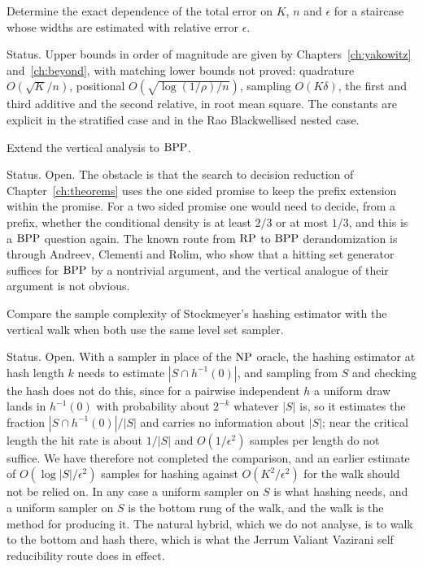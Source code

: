 \begin{problem}
Determine the exact dependence of the total error on $K$, $n$ and $\epsilon$ for a staircase whose widths are estimated with relative error $\epsilon$.
\end{problem}

Status. Upper bounds in order of magnitude are given by Chapters~\ref{ch:yakowitz} and~\ref{ch:beyond}, with matching lower bounds not proved: quadrature $O(\sqrt K / n)$, positional $O(\sqrt{\log(1/\rho) / n})$, sampling $O(K \delta)$, the first and third additive and the second relative, in root mean square. The constants are explicit in the stratified case and in the Rao Blackwellised nested case.

\begin{problem}
Extend the vertical analysis to $\mathrm{BPP}$.
\end{problem}

Status. Open. The obstacle is that the search to decision reduction of Chapter~\ref{ch:theorems} uses the one sided promise to keep the prefix extension within the promise. For a two sided promise one would need to decide, from a prefix, whether the conditional density is at least $2/3$ or at most $1/3$, and this is a $\mathrm{BPP}$ question again. The known route from $\mathrm{RP}$ to $\mathrm{BPP}$ derandomization is through Andreev, Clementi and Rolim, who show that a hitting set generator suffices for $\mathrm{BPP}$ by a nontrivial argument, and the vertical analogue of their argument is not obvious.

\begin{problem}
Compare the sample complexity of Stockmeyer's hashing estimator with the vertical walk when both use the same level set sampler.
\end{problem}

Status. Open. With a sampler in place of the $\mathrm{NP}$ oracle, the hashing estimator at hash length $k$ needs to estimate $|S \cap h^{-1}(0)|$, and sampling from $S$ and checking the hash does not do this, since for a pairwise independent $h$ a uniform draw lands in $h^{-1}(0)$ with probability about $2^{-k}$ whatever $|S|$ is, so it estimates the fraction $|S \cap h^{-1}(0)|/|S|$ and carries no information about $|S|$; near the critical length the hit rate is about $1/|S|$ and $O(1/\epsilon^2)$ samples per length do not suffice. We have therefore not completed the comparison, and an earlier estimate of $O(\log|S|/\epsilon^2)$ samples for hashing against $O(K^2/\epsilon^2)$ for the walk should not be relied on. In any case a uniform sampler on $S$ is what hashing needs, and a uniform sampler on $S$ is the bottom rung of the walk, and the walk is the method for producing it. The natural hybrid, which we do not analyse, is to walk to the bottom and hash there, which is what the Jerrum Valiant Vazirani self reducibility route does in effect.

